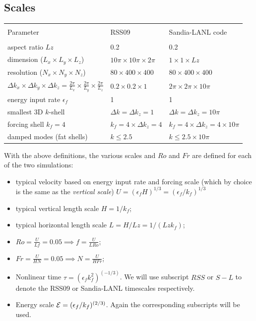\documentclass[12pt]{article}
\begin{document}
\subsection{Scales}
\begin{table}[ht]
\begin{tabular}{lll}
\hline\\
Parameter & RSS09 & Sandia-LANL code\\
\hline\\
aspect ratio $Lz$ & 0.2 & 0.2\\
dimension ($L_x \times L_y\times L_z$) & $10\pi \times 10\pi \times 2\pi $ & $1  \times 1 \times Lz$ \\  
resolution ($N_x \times N_y \times N_z$) & $80 \times 400 \times 400$ & $80 \times 400 \times 400$ \\
$\Delta k_x \times \Delta k_y \times \Delta k_z = \frac{2\pi}{L_x} \times \frac{2\pi}{L_y} \times \frac{2\pi}{L_z}$ & 
$0.2 \times 0.2 \times 1$ & $2\pi \times 2\pi \times 10\pi$  \\
energy input rate $\epsilon_f$ & 1 & 1 \\
smallest 3D $k$-shell &  $\Delta k = \Delta k_z = 1$ & $\Delta k = \Delta k_z = 10\pi$\\  
forcing shell $k_f = 4$ & $k_f = 4\times \Delta k_z = 4$ & $k_f = 4 \times \Delta k_z = 4\times 10\pi$\\
damped modes (fat shells) & $k \leq 2.5$ & $k \leq 2.5\times 10\pi $ \\
\hline
\end{tabular}
\end{table}

With the above definitions, the various scales and $Ro$ and $Fr$ are
defined for each of the two simulations:
\begin{itemize}
\item typical velocity based on energy input rate and forcing scale
  (which by choice is the same as the {\it vertical scale}) $U =
  ({\epsilon_f}{H})^{1/3} = (\epsilon_f/k_f)^{1/3}$
\item typical vertical length scale $H = 1/k_f$; 
\item typical horizontal length scale $L = H/Lz = 1/(Lz k_f)$;
\item $Ro = \frac{U}{Lf} = 0.05 \implies f = \frac{U}{L Ro}$;
\item $Fr = \frac{U}{HN} = 0.05 \implies N = \frac{U}{H Fr}$;
\item Nonlinear time $\tau = (\epsilon_f k_f^2)^{(-1/3)}$. We will use subscript $RSS$ or $S-L$ to denote the RSS09 or Sandia-LANL timescales respectively.
\item Energy scale ${\cal E} = (\epsilon_f /k_f)^{(2/3)}$. Again the corresponding subscripts will be used.
\end{itemize}
\end{document}
